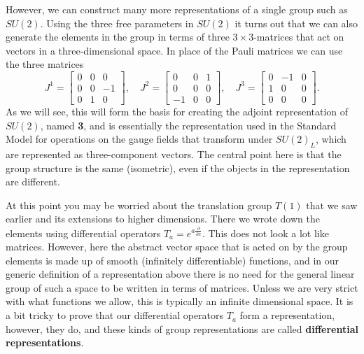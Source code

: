 \documentclass[notes.tex]{subfiles}
\begin{document}
However, we can construct many more representations of a single group such as $SU(2)$. Using the three free parameters in $SU(2)$ it turns out that we can also generate the elements in the group in terms of three  $3\times3$-matrices that act on vectors in a three-dimensional space. In place of the Pauli matrices we can use the three matrices
\begin{equation}
J^1 =\left[\begin{matrix} 0 & 0 & 0 \\ 0 & 0 & -1 \\ 0 & 1 & 0  \end{matrix}\right], 
\quad J^2 =\left[\begin{matrix} 0 & 0 & 1 \\ 0 & 0 & 0 \\ -1 & 0 & 0  \end{matrix}\right], 
\quad J^3 =\left[\begin{matrix} 0 & -1 & 0 \\ 1 & 0 & 0 \\ 0 & 0 & 0  \end{matrix}\right].
\label{eq:SO3_generators}
\end{equation}
As we will see, this will form the basis for creating the adjoint representation of $SU(2)$, named {\bf 3}, and is essentially the representation used in the Standard Model for operations on the gauge fields that transform under $SU(2)_L$, which are represented as three-component vectors. The central point here is that the group structure is the same (isometric), even if the objects in the representation are different.

At this point you may be worried about the translation group $T(1)$ that we saw earlier and its extensions to higher dimensions. There we wrote down the elements using differential operators $T_a=e^{a\frac{\partial}{\partial x}}$. This does not look a lot like matrices. However, here the abstract vector space that is acted on by the group elements is made up of smooth (infinitely differentiable) functions, and in our generic definition of a representation above there is no need for the general linear group of such a space to be written in terms of matrices. Unless we are very strict with what functions we allow, this is typically an infinite dimensional space. It is a bit tricky to prove that our differential operators $T_a$ form a representation, however, they do, and these kinds of group representations are called {\bf differential representations}.
\end{document}
